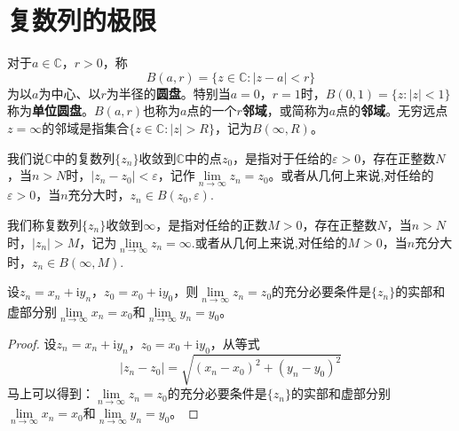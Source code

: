 \documentclass[../../main.tex]{subfiles}%
\begin{document}
\section{复数列的极限}

\begin{definition}
对于\(a \in \mathbb{C}\)，\(r > 0\)，称
\[
B(a, r) = \{ z \in \mathbb{C} : | z - a | < r \}
\]
为以\(a\)为中心、以\(r\)为半径的\textbf{圆盘}。特别当\(a = 0\)，\(r = 1\)时，\(B(0, 1) = \{ z : | z | < 1 \}\)称为\textbf{单位圆盘}。\(B(a, r)\)也称为\(a\)点的一个\textbf{\(r\)邻域}，或简称为\(a\)点的\textbf{邻域}。无穷远点\(z = \infty\)的邻域是指集合\(\{ z \in \mathbb{C} : | z | > R \}\)，记为\(B(\infty, R)\)。
\end{definition}

\begin{definition}
我们说\(\mathbb{C}\)中的复数列\(\{ z_n \}\)收敛到\(\mathbb{C}\)中的点\(z_0\)，是指对于任给的\(\varepsilon > 0\)，存在正整数\(N\)，当\(n > N\)时，\(| z_n - z_0 | < \varepsilon\)，记作\(\lim\limits_{n \to \infty} z_n = z_0\)。或者从几何上来说,对任给的\(\varepsilon > 0\)，当\(n\)充分大时，\(z_n \in B(z_0, \varepsilon)\).

我们称复数列\(\{ z_n \}\)收敛到\(\infty\)，是指对任给的正数\(M > 0\)，存在正整数\(N\)，当\(n > N\)时，\(| z_n | > M\)，记为\(\lim\limits_{n \to \infty} z_n = \infty\).或者从几何上来说,对任给的\(M > 0\)，当\(n\)充分大时，\(z_n \in B(\infty, M)\).
\end{definition}

\begin{theorem}\label{theorem:复数收敛的充要条件}
设\(z_n = x_n + \mathrm{i}y_n\)，\(z_0 = x_0 + \mathrm{i}y_0\)，则\(\lim\limits_{n \to \infty} z_n = z_0\)的充分必要条件是\(\{ z_n \}\)的实部和虚部分别\(\lim\limits_{n \to \infty} x_n = x_0\)和\(\lim\limits_{n \to \infty} y_n = y_0\)。
\end{theorem}
\begin{proof}
设\(z_n = x_n + \mathrm{i}y_n\)，\(z_0 = x_0 + \mathrm{i}y_0\)，从等式
\[
| z_n - z_0 | = \sqrt{(x_n - x_0)^2 + (y_n - y_0)^2}
\]
马上可以得到：\(\lim\limits_{n \to \infty} z_n = z_0\)的充分必要条件是\(\{ z_n \}\)的实部和虚部分别\(\lim\limits_{n \to \infty} x_n = x_0\)和\(\lim\limits_{n \to \infty} y_n = y_0\)。
\end{proof}
\end{document}

